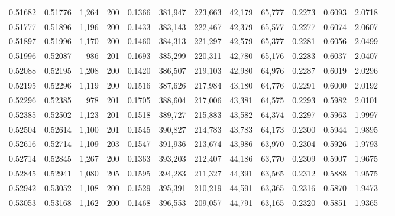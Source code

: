 \begin{tabular}{rrrrrrrrrrrrr}
0.51682 & 0.51776 & 1,264 & 200 &                                     0.1366 & 381,947 & 223,663 &  42,179 &  65,777 & 0.2273 & 0.6093 & 2.0718 \\
0.51777 & 0.51896 & 1,196 & 200 &                                     0.1433 & 383,143 & 222,467 &  42,379 &  65,577 & 0.2277 & 0.6074 & 2.0607 \\
0.51897 & 0.51996 & 1,170 & 200 &                                     0.1460 & 384,313 & 221,297 &  42,579 &  65,377 & 0.2281 & 0.6056 & 2.0499 \\
0.51996 & 0.52087 &   986 & 201 &                                     0.1693 & 385,299 & 220,311 &  42,780 &  65,176 & 0.2283 & 0.6037 & 2.0407 \\
0.52088 & 0.52195 & 1,208 & 200 &                                     0.1420 & 386,507 & 219,103 &  42,980 &  64,976 & 0.2287 & 0.6019 & 2.0296 \\
0.52195 & 0.52296 & 1,119 & 200 &                                     0.1516 & 387,626 & 217,984 &  43,180 &  64,776 & 0.2291 & 0.6000 & 2.0192 \\
0.52296 & 0.52385 &   978 & 201 &                                     0.1705 & 388,604 & 217,006 &  43,381 &  64,575 & 0.2293 & 0.5982 & 2.0101 \\
0.52385 & 0.52502 & 1,123 & 201 &                                     0.1518 & 389,727 & 215,883 &  43,582 &  64,374 & 0.2297 & 0.5963 & 1.9997 \\
0.52504 & 0.52614 & 1,100 & 201 &                                     0.1545 & 390,827 & 214,783 &  43,783 &  64,173 & 0.2300 & 0.5944 & 1.9895 \\
0.52616 & 0.52714 & 1,109 & 203 &                                     0.1547 & 391,936 & 213,674 &  43,986 &  63,970 & 0.2304 & 0.5926 & 1.9793 \\
0.52714 & 0.52845 & 1,267 & 200 &                                     0.1363 & 393,203 & 212,407 &  44,186 &  63,770 & 0.2309 & 0.5907 & 1.9675 \\
0.52845 & 0.52941 & 1,080 & 205 &                                     0.1595 & 394,283 & 211,327 &  44,391 &  63,565 & 0.2312 & 0.5888 & 1.9575 \\
0.52942 & 0.53052 & 1,108 & 200 &                                     0.1529 & 395,391 & 210,219 &  44,591 &  63,365 & 0.2316 & 0.5870 & 1.9473 \\
0.53053 & 0.53168 & 1,162 & 200 &                                     0.1468 & 396,553 & 209,057 &  44,791 &  63,165 & 0.2320 & 0.5851 & 1.9365 \\

\end{tabular}
